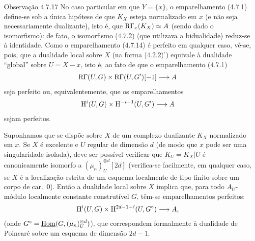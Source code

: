 \begin{statement}{Observação 4.7.17}
No caso particular em que $Y=\{x\}$, o emparelhamento (4.7.1) define-se sob a única hipótese de que $K_X$ esteja normalizado em $x$ (e não seja necessariamente dualizante), isto é, que $\mathrm{R}\Gamma_x(K_X)\simeq A$ (sendo dado o isomorfismo): de fato, o isomorfismo (4.7.2) (que utilizava a bidualidade) reduz-se à identidade. Como o emparelhamento (4.7.14) é perfeito em qualquer caso, vê-se, pois, que a dualidade local sobre $X$ (na forma (4.2.2)') equivale à dualidade \textquotedblleft global\textquotedblright{} sobre $U=X-x$, isto é, ao fato de que o emparelhamento (4.7.1)
\[
\mathrm{R}\Gamma(U,G)\times\mathrm{R}\Gamma(U,G')[-1]\longrightarrow A
\]
seja perfeito ou, equivalentemente, que os emparelhamentos
\[
\mathrm{H}^i(U,G)\times\mathrm{H}^{-i-1}(U,G')\longrightarrow A
\]
sejam perfeitos.

Suponhamos que se dispõe sobre $X$ de um complexo dualizante $K_X$ normalizado em $x$. Se $X$ é excelente e $U$ regular de dimensão $d$ (de modo que $x$ pode ser uma singularidade isolada), deve ser possível verificar que $K_U=K_X|U$ é canonicamente isomorfo a $(\mu_n)_U^{\otimes d}[2d]$ (verifica-se facilmente, em qualquer caso, se $X$ é a localização estrita de um esquema localmente de tipo finito sobre um corpo de car.~0). Então a dualidade local sobre $X$ implica que, para todo $A_U$-módulo localmente constante construtível $G$, têm-se emparelhamentos perfeitos:
\[
\mathrm{H}^i(U,G)\times\mathrm{H}^{2d-1-i}(U,G^\circ)\longrightarrow A,
\]
(onde $G^\circ=\underline{\operatorname{Hom}}(G,(\mu_n)_U^{\otimes d})$), que correspondem formalmente à dualidade de Poincaré sobre um esquema de dimensão $2d-1$.
\end{statement}

